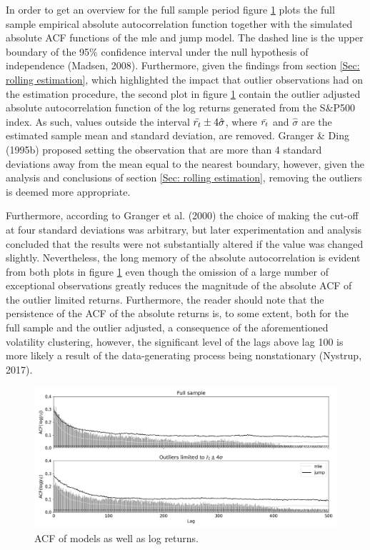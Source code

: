  In order to get an overview for the full sample period figure \ref{fig:stylized_facts_acf_plots} plots the full sample empirical absolute autocorrelation function together with the simulated absolute ACF functions of the mle and jump model. The dashed line is the upper boundary of the 95\% confidence interval under the null hypothesis of independence (Madsen, 2008). Furthermore, given the findings from section \ref{Sec: rolling estimation}, which highlighted the impact that outlier observations had on the estimation procedure, the second plot in figure \ref{fig:stylized_facts_acf_plots} contain the outlier adjusted absolute autocorrelation function of the log returns generated from the S\&P500 index. As such, values outside the interval $\Bar{r_t}\pm 4\hat{\sigma}$, where $\Bar{r_t}$ and $\hat{\sigma}$ are the estimated sample mean and standard deviation, are removed. Granger \& Ding (1995b) proposed setting the observation that are more than 4 standard deviations away from the mean equal to the nearest boundary, however, given the analysis and conclusions of section \ref{Sec: rolling estimation}, removing the outliers is deemed more appropriate. 

Furthermore, according to Granger et al. (2000) the choice of making the cut-off at four standard deviations was arbitrary, but later experimentation and analysis concluded that the results were not
substantially altered if the value was changed slightly. Nevertheless, the long memory of the absolute autocorrelation is evident from both plots in figure \ref{fig:stylized_facts_acf_plots} even though the omission of a large number of exceptional observations greatly reduces the magnitude of the absolute ACF of the outlier limited returns. Furthermore, the reader should note that the persistence of the ACF of the absolute returns is, to some extent, both for the full sample and the outlier adjusted, a consequence of the aforementioned volatility clustering, however, the significant level of the lags above lag 100 is more likely a result of the data-generating process being nonstationary (Nystrup, 2017). 

\begin{figure}[H] 
    \centering
    \includegraphics[width=1.0\textwidth]{analysis/stylized_facts/images/acf_abs_models.png}
    \caption{ACF of models as well as log returns.}
    \label{fig:stylized_facts_acf_plots} 
\end{figure}

